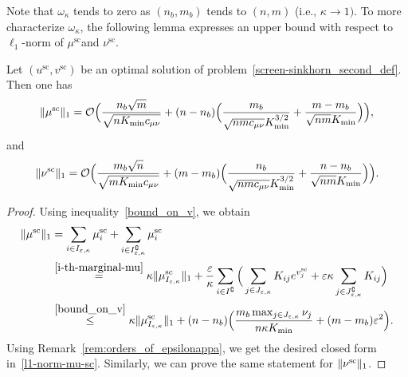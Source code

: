 Note that $\omega_{\kappa}$ tends to zero as $(n_b,m_b)$ tends to $(n,m)$ (i.e., $\kappa \rightarrow 1)$. To more characterize $\omega_\kappa$, the following 
lemma expresses an upper bound with respect to $\ell_1$-norm of $\mu^{\text{sc}}$and $\nu^{\text{sc}}$. 
\begin{lemma}
\label{lemma_bounds_on_marginals}
Let $(u^{\text{sc}}, v^{\text{sc}})$ be an optimal solution of problem~\eqref{screen-sinkhorn_second_def}.
Then one has 
\begin{align}
\label{l1-norm-mu-sc}
\|\mu^{\text{sc}}\|_1 = \mathcal{O}\Big(\frac{n_b\sqrt{m}}{\sqrt{nK_{\min}c_{\mu\nu}}} + (n-n_b)\Big(\frac{m_b}{\sqrt{nmc_{\mu\nu}}K_{\min}^{3/2}} + \frac{m-m_b}{\sqrt{nm}K_{\min}}\Big)\Big),
\end{align}
and
\begin{align}
\label{l1-norm-nu-sc}
\|\nu^{\text{sc}}\|_1 = \mathcal{O}\Big(\frac{m_b\sqrt{n}}{\sqrt{mK_{\min}c_{\mu\nu}}} + (m-m_b)\Big(\frac{n_b}{\sqrt{nmc_{\mu\nu}}K_{\min}^{3/2}} + \frac{n-n_b}{\sqrt{nm}K_{\min}}\Big)\Big).
\end{align}
\end{lemma}

\begin{proof}
Using inequality~\eqref{bound_on_v}, we obtain 
\begin{align*}
\|\mu^{\text{sc}}\|_1 &= \sum_{i \in I_{\varepsilon,\kappa}} \mu^{\text{sc}}_i +  \sum_{i \in I^\complement_{\varepsilon,\kappa}}\mu^{\text{sc}}_i\\
& \overset{\eqref{i-th-marginal-mu}}{=} \kappa \|\mu_{I_{\varepsilon,\kappa}}^{\text{sc}}\|_1 + \frac \varepsilon\kappa \sum_{i \in I^\complement}\Big( \sum_{j \in J_{\varepsilon,\kappa}} K_{ij} e^{v^{\text{sc}}_j} + \varepsilon\kappa \sum_{j\in J^\complement_{\varepsilon,\kappa}}K_{ij}\Big)\\
& \overset{\eqref{bound_on_v}}{\leq} \kappa \|\mu_{I_{\varepsilon,\kappa}}^{\text{sc}}\|_1 + (n-n_b) \Big(\frac{m_b\max_{j \in J_{\varepsilon,\kappa}} \nu_j}{n\kappa K_{\min}} + (m-m_b)\varepsilon^2 \Big).
\end{align*}
Using Remark~\ref{rem:orders_of_epsilonappa}, we get the desired closed form in~\eqref{l1-norm-mu-sc}.
Similarly, we can prove the same statement for $\|\nu^{\text{sc}}\|_1$.
\end{proof}

